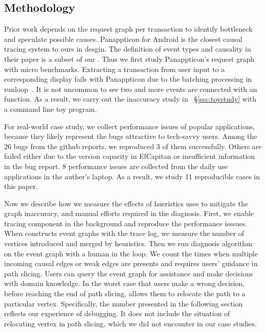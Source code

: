\subsection{Methodology} \label{sec:methodology}


Prior work depends on the request graph per transaction to identify bottleneck
and speculate possible causes. Panappticon for Android is the closest causal
tracing system to ours in desgin. The definition of event types and causality in
their paper is a subset of our \xxx. Thus we first study Panappticon's request
graph with micro benchmarks. Extracting a transaction from user input to a
corresponding display fails with Panappticon due to the batching processing in
runloop~\cite{runloop}. It is not uncommon to see two and more  events
are connected with an  function. As a result, we
carry out the inaccuracy study in ~\S\ref{sec:toystudy} with a command line toy
program.

For real-world case study, we collect performance issues of popular
applications, because they likely represent the bugs attractive to tech-savvy
users. Among the 26 bugs from the github reports, we reproduced 3 of them
successfully. Others are failed either due to the version capacity in ElCapitan
or insufficient information in the bug report. 8 performance issues are
collected from the daily use applications in the auther's laptop. As a result,
we study 11 reproducible cases in this paper.


Now we describe how we measure the effects of hueristics \xxx uses to
mitigate the graph inaccuracy, and manual efforts required in the diagnosis.
First, we enable tracing component in the background and reproduce the
performance isssues.  When \xxx constructs event graphs with the trace log, we
measure the number of vertices introduced and merged by heuristics.  Then we
run \xxx diagnosis algorithm on the event graph with a human in the loop. We
count the times when multiple incoming causal edges or weak edges are presents
and \xxx requires users' guidance in path slicing. Users can query the event
graph for assistance and make decisions with domain knowledge. In the worst
case that users make a wrong decision, before reaching the end of path slicing,
\xxx allows them to relocate the path to a particular vertex. Specifically, the
number presented in the following section reflects our experience of debugging.
It does not include the situation of relocating vertex in path slicing, which
we did not encounter in our case studies.
